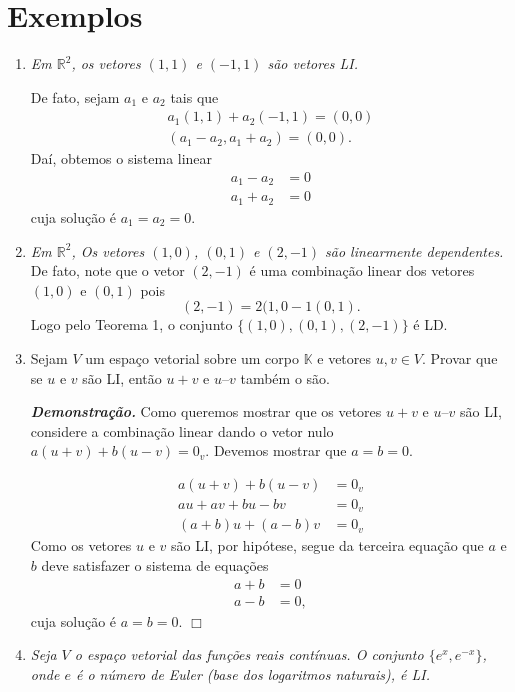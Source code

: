 \section{Exemplos}
\begin{enumerate}
\item \textit{Em $\mathbb{R}^2$, os vetores $(1,1)$  e $(-1,1)$ são vetores LI. }

 De fato, sejam $a_1$ e $a_2$ tais que  \begin{align*} a_1(1,1) + a_2(-1,1)=(0,0)\\ (a_1-a_2, a_1+a_2)=(0,0).\end{align*} Daí, obtemos o sistema linear
\begin{align*} a_1-a_2&=0   \\ a_1+a_2 &=0\end{align*}    cuja solução é $a_1=a_2=0$.

\item \textit{Em $\mathbb{R}^2$, Os vetores $(1,0)$, $(0,1)$ e $(2,-1)$ são linearmente dependentes. }  De fato, note que o vetor $(2,-1)$ é uma combinação linear dos vetores $(1,0)$ e $(0,1)$  pois $$(2,-1)=2(1,0-1(0,1).$$  Logo pelo  Teorema 1,  o conjunto $\{(1,0), (0,1), (2,-1)\}$ é LD.



\item Sejam  $V$  um espaço vetorial sobre um corpo $\mathbb{K}$ e  vetores $u, v \in V$. Provar que se $u$ e $v$ são LI, então $u + v$ e $ u – v$ também o são.

\textbf{\textit{Demonstração.}} Como queremos mostrar que os vetores $u + v$ e $ u – v$ são LI, considere a combinação linear dando o vetor nulo $ a(u+v)+b(u-v)=0_v$. Devemos mostrar que $a=b=0$.

\begin{align*} a(u+v)+b(u-v)&=0_v   \\
                   au+av+bu-bv &=0_v\\
                   (a+b)u+(a-b)v&=0_v
\end{align*}
Como os vetores $u$ e $v$ são LI, por hipótese, segue da terceira equação que $a$ e $b$ deve satisfazer o sistema de equações
\begin{align*} a+b&=0   \\ a-b &=0,\end{align*} cuja solução é $a=b=0$. $\Box$


\item \textit{ Seja $V$ o espaço vetorial das funções reais contínuas. O conjunto $\{ e^x, e^{-x}\}$, onde $e$ é o número de Euler (base dos logaritmos naturais),  é LI.}


\end{enumerate}
